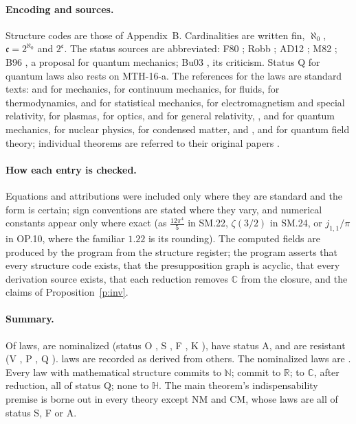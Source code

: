 \documentclass{situationist-preprint}
\begin{document}
\paragraph{Encoding and sources.} Structure codes are those of Appendix~B. Cardinalities are written fin, $\aleph_0$, $\mathfrak c = 2^{\aleph_0}$ and $2^{\mathfrak c}$. The status sources are abbreviated: F80 \citep{Field1980}; Robb \citep{Robb1914}; AD12 \citep{ArntzeniusDorr2012}; M82 \citep{Malament1982}; B96 \citep{Balaguer1996}, a proposal for quantum mechanics; Bu03 \citep{Bueno2003}, its criticism. Status Q for quantum laws also rests on MTH-16-a. The references for the laws are standard texts: \citet{GoldsteinPooleSafko2002} and \citet{Arnold1989} for mechanics, \citet{Gurtin1981} for continuum mechanics, \citet{LandauLifshitz1987} for fluids, \citet{Callen1985} for thermodynamics, \citet{Huang1987} and \citet{Reif1965} for statistical mechanics, \citet{Jackson1999} for electromagnetism and special relativity, \citet{Chen1984} for plasmas, \citet{BornWolf1999} for optics, \citet{Wald1984} and \citet{MisnerThorneWheeler1973} for general relativity, \citet{SakuraiNapolitano2011}, \citet{vonNeumann1932} and \citet{ReedSimon1980} for quantum mechanics, \citet{Krane1988} for nuclear physics, \citet{AshcroftMermin1976} for condensed matter, and \citet{PeskinSchroeder1995}, \citet{Weinberg1995} and \citet{StreaterWightman1964} for quantum field theory; individual theorems are referred to their original papers \citep{CHSH1969,Cirelson1980,Gleason1957,KochenSpecker1967,WoottersZurek1982}.

\paragraph{How each entry is checked.} Equations and attributions were included only where they are standard and the form is certain; sign conventions are stated where they vary, and numerical constants appear only where exact (as $\frac{12\pi^4}{5}$ in SM.22, $\zeta(3/2)$ in SM.24, or $j_{1,1}/\pi$ in OP.10, where the familiar $1.22$ is its rounding). The computed fields are produced by the program from the structure register; the program asserts that every structure code exists, that the presupposition graph is acyclic, that every derivation source exists, that each reduction removes $\mathbb C$ from the closure, and the claims of Proposition~\ref{p:inv}.

\paragraph{Summary.} Of \nLaws{} laws, \nNominalized{} are nominalized (status O \nStatO, S \nStatS, F \nStatF, K \nStatK), \nStatA{} have status A, and \nResistant{} are resistant (V \nStatV, P \nStatP, Q \nStatQ). \nDerived{} laws are recorded as derived from others. The nominalized laws are \listNominalized. Every law with mathematical structure commits to $\mathbb N$; \nNumR{} commit to $\mathbb R$; \nNumC{} to $\mathbb C$, \nMinC{} after reduction, all of status Q; none to $\mathbb H$. The main theorem's indispensability premise is borne out in every theory except NM and CM, whose laws are all of status S, F or A.
\end{document}
